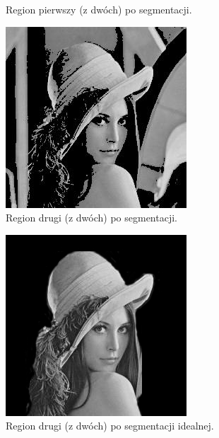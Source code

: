 \documentclass[10pt]{llncs}
\begin{document}
\begin{figure}[!htb]
  \caption{Region pierwszy (z dwóch) po segmentacji.}\label{fig:51}
\endminipage\hfill
{}
  \includegraphics[width=\linewidth]{img/03_region_02.jpg}
  \caption{Region drugi (z dwóch) po segmentacji.}\label{fig:61}
\endminipage
\end{figure}

\begin{figure}[!htb]
  \includegraphics[width=\linewidth]{img/03_correct_segmentation.jpg}
  \caption{Region drugi (z dwóch) po segmentacji idealnej.}\label{fig:411}
\endminipage\hfill
\end{figure}
\end{document}
